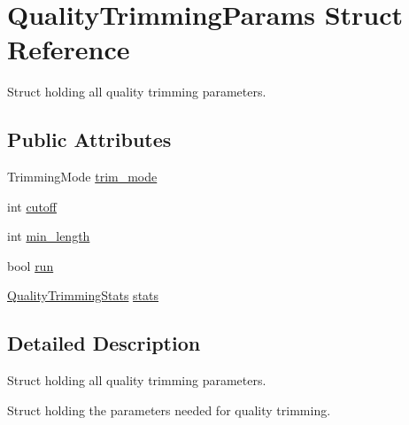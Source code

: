 \hypertarget{struct_quality_trimming_params}{\section{Quality\-Trimming\-Params Struct Reference}
\label{struct_quality_trimming_params}
}


Struct holding all quality trimming parameters.  


\subsection*{Public Attributes}
\begin{DoxyCompactItemize}
\item 
Trimming\-Mode \hyperlink{struct_quality_trimming_params_a048e76b525de1500f55f39e9e572ab80}{trim\-\_\-mode}
\item 
int \hyperlink{struct_quality_trimming_params_a3b2b268123a0054eda2f603e7be590dc}{cutoff}
\item 
int \hyperlink{struct_quality_trimming_params_a754750a0a278d17d82a02dedfbf185ba}{min\-\_\-length}
\item 
bool \hyperlink{struct_quality_trimming_params_a1b2db8d78cae5e3db9d8fc903e042310}{run}
\item 
\hyperlink{struct_quality_trimming_stats}{Quality\-Trimming\-Stats} \hyperlink{struct_quality_trimming_params_a5f07878380511531b124c6f94a611b91}{stats}
\end{DoxyCompactItemize}


\subsection{Detailed Description}
Struct holding all quality trimming parameters. 

Struct holding the parameters needed for quality trimming. 

